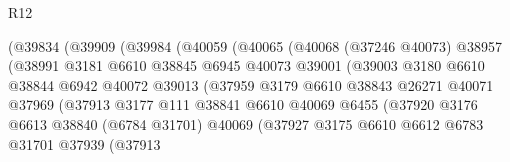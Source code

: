 \begin{lexlean}{R12}
\begin{coremodule}
                            (@39834
                              (@39909
                                (@39984
                                  (@40059
                                    (@40065
                                      (@40068
                                        (@37246 @40073)
                                        @38957
                                        (@38991
                                          @3181
                                          @6610
                                          @38845
                                          @6945
                                          @40073
                                          @39001
                                          (@39003
                                            @3180
                                            @6610
                                            @38844
                                            @6942
                                            @40072
                                            @39013
                                            (@37959
                                              @3179
                                              @6610
                                              @38843
                                              @26271
                                              @40071
                                              @37969
                                              (@37913
                                                @3177
                                                @111
                                                @38841
                                                @6610
                                                @40069
                                                @6455
                                                (@37920
                                                  @3176
                                                  @6613
                                                  @38840
                                                  (@6784 @31701)
                                                  @40069
                                                  (@37927
                                                    @3175
                                                    @6610
                                                    @6612
                                                    @6783
                                                    @31701
                                                    @37939
                                                    (@37913

\end{coremodule}
\end{lexlean}
